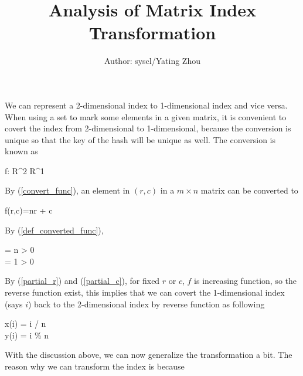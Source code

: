 \documentclass[10pt]{article}
\begin{document}
	\title{%
		\textbf{Analysis of Matrix Index Transformation}} 
		\author{
			Author: syscl/Yating Zhou\\ 
		}
	\maketitle
		We can represent a 2-dimensional index to 1-dimensional index and vice versa. When using a set to mark some elements in a given matrix, it is convenient to covert the index from 2-dimensional to 1-dimensional, because the conversion is unique so that the key of the hash will be unique as well. The conversion is known as
		\begin{flalign}
			f: R^2 \to R^1  \label{convert_func}
		\end{flalign}      
		By (\ref{convert_func}), an element in $(r,c)$ in a $m\times n$ matrix can be converted to  
		\begin{flalign}
			f(r,c)=nr + c \label{def_converted_func} 
		\end{flalign}
		By (\ref{def_converted_func}),
		\begin{flalign}
			 = n > 0 \label{partial_r}\\
			 = 1 > 0 \label{partial_c}
		\end{flalign}
		By (\ref{partial_r}) and (\ref{partial_c}), for fixed $r$ or $c$, $f$ is increasing function, so the reverse function exist, this implies that we can covert the 1-dimensional index (says $i$) back to the 2-dimensional index by reverse function as following
		\begin{flalign}
			x(i) = i / n \label{get_x}\\
			y(i) = i \% n\label{get_y}
		\end{flalign}
		With the discussion above, we can now generalize the transformation a bit. The reason why we can transform the index is because 
			
\end{document}
